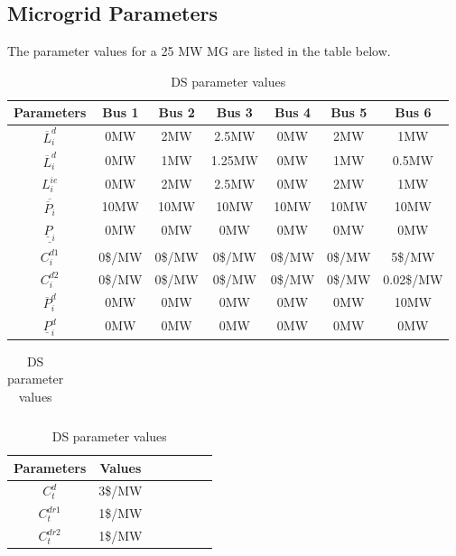 \subsection{Microgrid Parameters}
The parameter values for a 25 MW MG are listed in the table below.

\begin{table}[h]
\centering
\begin{tabular}{ |c|c|c|c|c|c|c| } 
 \hline
Parameters & Bus 1 & Bus 2& Bus 3& Bus 4& Bus 5& Bus 6\\ 
 \hline
$\overline{L}^d_{i}$ & 0MW & 2MW & 2.5MW & 0MW & 2MW & 1MW\\ 
 \hline
$\overline{L}^d_{i}$ & 0MW & 1MW & 1.25MW & 0MW & 1MW & 0.5MW  \\ 
 \hline
$L^{ie}_{i}$ & 0MW & 2MW & 2.5MW & 0MW & 2MW & 1MW  \\ 
 \hline
$\overline{\overline{P}_{i}}$ & 10MW & 10MW & 10MW & 10MW & 10MW & 10MW  \\ 
 \hline
$\underline{\underline{P}_{i}}$ & 0MW & 0MW & 0MW & 0MW & 0MW & 0MW  \\ 
 \hline
$C^{d1}_{i}$ & 0\$/MW & 0\$/MW & 0\$/MW & 0\$/MW & 0\$/MW & 5\$/MW   \\ 
 \hline
$C^{d2}_{i}$ & 0\$/MW & 0\$/MW & 0\$/MW & 0\$/MW & 0\$/MW & 0.02\$/MW   \\ 
 \hline
$\overline P^d_i$ & 0MW & 0MW & 0MW & 0MW & 0MW & 10MW \\ 
 \hline
 $\underline P^d_i$ & 0MW & 0MW & 0MW & 0MW & 0MW & 0MW  \\ 
 \hline
\end{tabular}

\begin{tabular}{ |c|c|c|c|c|c|c| } 
 \hline

\end{tabular}
 
\begin{tabular}{ |c|c|c|c|c|c|c| } 
 \hline
Parameters & Values\\ 
 \hline
$C^{d}_t$ & 3\$/MW  \\ 
 \hline
 $C^{dr1}_t$ & 1\$/MW  \\ 
 \hline
$C^{dr2}_t$ & 1\$/MW  \\ 
 \hline
\end{tabular}
\caption{DS parameter values}
 \label{wdlevel}
\end{table} 
